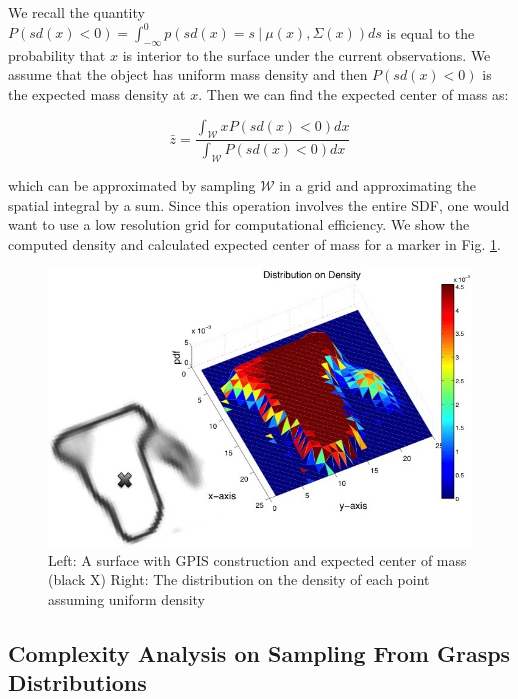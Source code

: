 \documentclass[letterpaper, 10 pt, conference]{ieeeconf}  %
\begin{document}
We recall the quantity $P(sd(x) < 0) = \int_{-\infty}^{0} p(sd(x) =  s \ | \ \mu(x),\Sigma(x)) ds$ is equal to the probability that $x$ is interior to the surface under the current observations.
We assume that the object has uniform mass density and then $P(sd(x) < 0)$ is the expected mass density at $x$.
Then we can find the expected center of mass as:

\begin{equation}
  \bar{z} 
  =
  \frac
    {\int_{\mathcal{W}}x P(sd(x)<0) dx}
    {\int_{\mathcal{W}}  P(sd(x)<0) dx}
\end{equation}

which can be approximated by sampling $\mathcal{W}$ in a grid and approximating the spatial integral by a sum. Since this operation involves the entire SDF, one would want to use a low resolution grid for computational efficiency. We show the computed density and calculated expected center of mass for a marker in Fig. \ref{fig:GPIS_MASS}.


\begin{figure}[ht!]
\centering
\includegraphics[scale = 0.3]{figures/Slide06.jpg}
\caption{ \footnotesize Left: A surface with GPIS construction and expected center of mass (black X)
Right: The distribution on the density of each point assuming uniform density}
\vspace*{-10pt}
\label{fig:GPIS_MASS}
\end{figure}

\subsection{Complexity Analysis on Sampling From Grasps Distributions}
\end{document}
